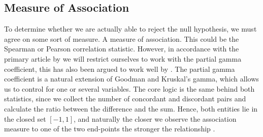 \documentclass[a4project,12pt]{article}
\theoremstyle{examplestyle}
\theoremstyle{defstyle}
\theoremstyle{thmstyle}
\begin{document}
\subsection{Measure of Association}
To determine whether we are actually able to reject the null hypothesis, we must agree on some sort of measure. A measure of association. This could be the Spearman or Pearson correlation statistic. However, in accordance with the primary article by \citet{kreiner-christensen-2011} we will restrict ourselves to work with the partial gamma coefficient, this has also been argued to work well by \cite{kreiner-christensen-2012}. The partial gamma coefficient is a natural extension of Goodman and Kruskal's gamma, which allows us to control for one or several variables. The core logic is the same behind both statistics, since we collect the number of concordant and discordant pairs and calculate the ratio between the difference and the sum. Hence, both entities lie in the closed set $[-1,1]$, and naturally the closer we observe the association measure to one of the two end-points the stronger the relationship \cite{agresti-1984}.
\end{document}
